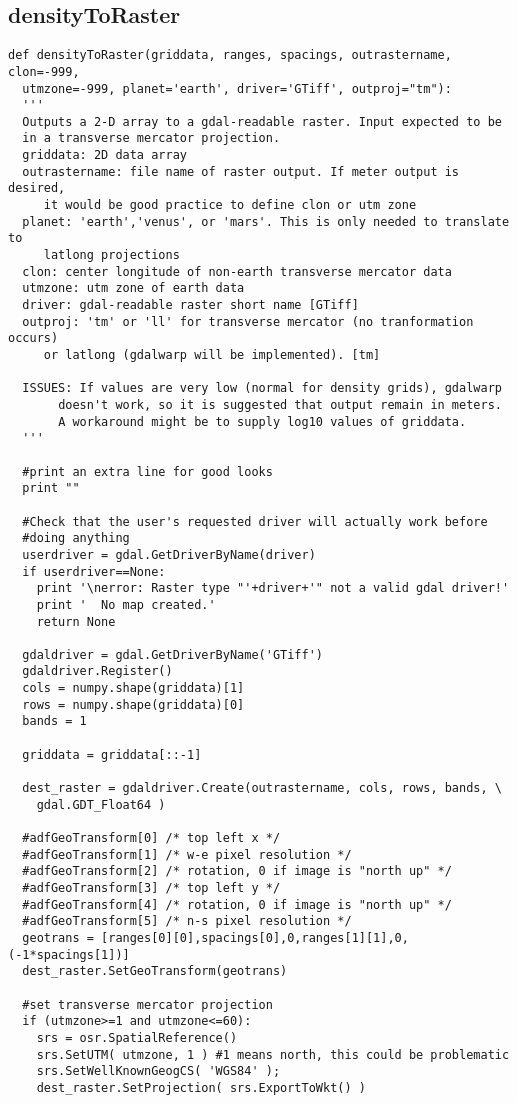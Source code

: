 \subsection{densityToRaster}
\begin{verbatim}
def densityToRaster(griddata, ranges, spacings, outrastername, clon=-999, 
  utmzone=-999, planet='earth', driver='GTiff', outproj="tm"):
  '''
  Outputs a 2-D array to a gdal-readable raster. Input expected to be
  in a transverse mercator projection.
  griddata: 2D data array
  outrastername: file name of raster output. If meter output is desired,
     it would be good practice to define clon or utm zone
  planet: 'earth','venus', or 'mars'. This is only needed to translate to
     latlong projections
  clon: center longitude of non-earth transverse mercator data
  utmzone: utm zone of earth data
  driver: gdal-readable raster short name [GTiff]
  outproj: 'tm' or 'll' for transverse mercator (no tranformation occurs)
     or latlong (gdalwarp will be implemented). [tm]
     
  ISSUES: If values are very low (normal for density grids), gdalwarp 
       doesn't work, so it is suggested that output remain in meters.
       A workaround might be to supply log10 values of griddata.
  '''
  
  #print an extra line for good looks
  print ""
  
  #Check that the user's requested driver will actually work before
  #doing anything
  userdriver = gdal.GetDriverByName(driver)
  if userdriver==None:
    print '\nerror: Raster type "'+driver+'" not a valid gdal driver!'
    print '  No map created.'
    return None
  
  gdaldriver = gdal.GetDriverByName('GTiff')
  gdaldriver.Register()
  cols = numpy.shape(griddata)[1]
  rows = numpy.shape(griddata)[0]
  bands = 1
  
  griddata = griddata[::-1]
  
  dest_raster = gdaldriver.Create(outrastername, cols, rows, bands, \
    gdal.GDT_Float64 )

  #adfGeoTransform[0] /* top left x */
  #adfGeoTransform[1] /* w-e pixel resolution */
  #adfGeoTransform[2] /* rotation, 0 if image is "north up" */
  #adfGeoTransform[3] /* top left y */
  #adfGeoTransform[4] /* rotation, 0 if image is "north up" */
  #adfGeoTransform[5] /* n-s pixel resolution */  
  geotrans = [ranges[0][0],spacings[0],0,ranges[1][1],0,(-1*spacings[1])]
  dest_raster.SetGeoTransform(geotrans)
  
  #set transverse mercator projection
  if (utmzone>=1 and utmzone<=60):
    srs = osr.SpatialReference()
    srs.SetUTM( utmzone, 1 ) #1 means north, this could be problematic
    srs.SetWellKnownGeogCS( 'WGS84' );
    dest_raster.SetProjection( srs.ExportToWkt() )


\end{verbatim}
